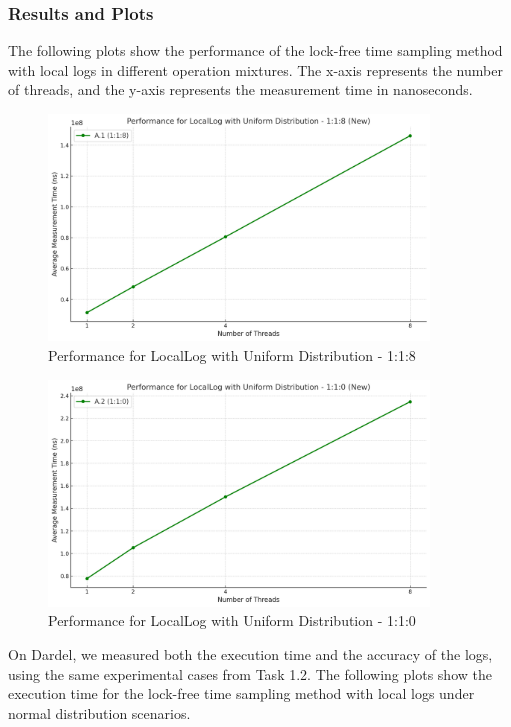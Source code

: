 \documentclass{article}
\begin{document}
\subsubsection{Results and Plots}

The following plots show the performance of the lock-free time sampling method with local logs in different operation mixtures. The x-axis represents the number of threads, and the y-axis represents the measurement time in nanoseconds.


\begin{figure}[H]
    \centering
    \includegraphics[width=0.9\textwidth]{LaTex/images/Lab 3 2.4.2.1.png}
    \caption{Performance for LocalLog with Uniform Distribution - 1:1:8}
    \label{fig:performance_a1}
\end{figure}

\begin{figure}[H]
    \centering
    \includegraphics[width=0.9\textwidth]{LaTex/images/Lab 3 2.4.2.2.png}
    \caption{Performance for LocalLog with Uniform Distribution - 1:1:0}
    \label{fig:performance_a2}
\end{figure}

On Dardel, we measured both the execution time and the accuracy of the logs, using the same experimental cases from Task 1.2. The following plots show the execution time for the lock-free time sampling method with local logs under normal distribution scenarios.
\end{document}
